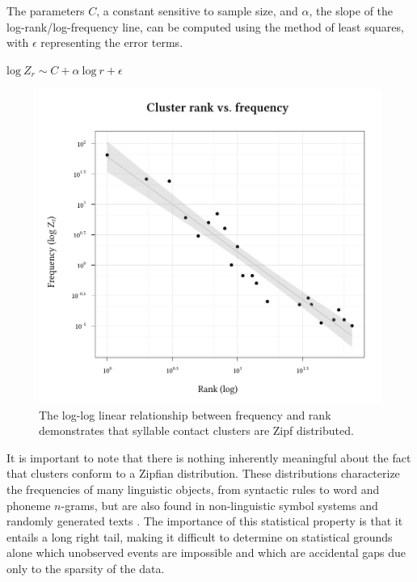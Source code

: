 \noindent The parameters $C$, a constant sensitive to sample size, and $\alpha$, the slope of the log-rank/log-frequency line, can be computed using the method of least squares, with $\epsilon$ representing the error terms.

\begin{unlabeledexample}
$\displaystyle \textrm{log}~Z_r \sim C + \alpha~\textrm{log}~r + \epsilon$ 
\end{unlabeledexample}

\begin{figure}
\centering
\includegraphics{cluster.pdf}
\caption{The log-log linear relationship between frequency and rank demonstrates that syllable contact clusters are Zipf distributed.}
\label{clus}
\end{figure}

It is important to note that there is nothing inherently meaningful about the fact that clusters conform to a Zipfian distribution. These distributions characterize the frequencies of many linguistic objects, from syntactic rules \citep{Yang2009} to word \citep{Teahan1998,Baroni2009} and phoneme \citep{Belevitch1956,Daland2011a} $n$-grams, but are also found in non-linguistic symbol systems \citep{Mandelbrot1954,Miller1957,Chomsky1958,Sproat2010} and randomly generated texts \citep{Miller1957,Li1992}. The importance of this statistical property is that it entails a long right tail, making it difficult to determine on statistical grounds alone which unobserved events are impossible and which are accidental gaps due only to the sparsity of the data. 

